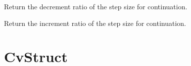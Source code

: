 \documentclass[a4paper,11pt,english]{sphinxmanual}
\begin{document}
\begin{fulllineitems}
\begin{fulllineitems}
\end{fulllineitems}


\begin{fulllineitems}
\label{\detokenize{python/cmdref_ContStruct:getfem.ContStruct.step_size_decrement}}
Return the decrement ratio of the step size for continuation.

\end{fulllineitems}


\begin{fulllineitems}
\label{\detokenize{python/cmdref_ContStruct:getfem.ContStruct.step_size_increment}}
Return the increment ratio of the step size for continuation.

\end{fulllineitems}


\end{fulllineitems}



\section{CvStruct}
\label{\detokenize{python/cmdref_CvStruct:cvstruct}}\label{\detokenize{python/cmdref_CvStruct::doc}}
\end{document}
